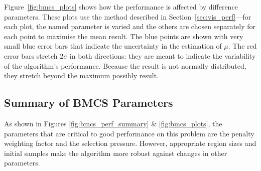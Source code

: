 \documentclass[10pt]{article}
\begin{document}
Figure~\ref{fig:bmcs_plots} shows how the performance is affected by
difference parameters. These plots use the method described in
Section~\ref{sec:vis_perf}---for each plot, the named parameter is varied and
the others are chosen separately for each point to maximise the mean result.
The blue points are shown with very small blue error bars that indicate the
uncertainty in the estimation of $\mu$. The red error bars stretch $2 \sigma$
in both directions: they are meant to indicate the variability of the
algorithm's performance. Because the result is not normally distributed,
they stretch beyond the maximum possibly result.

\subsection{Summary of BMCS Parameters}
\label{sec:bmcs_summary}

As shown in Figures \ref{fig:bmcs_perf_summary} \& \ref{fig:bmcs_plots}, the
parameters that are critical to good performance on this problem are the
penalty weighting factor and the selection pressure. However, appropriate
region sizes and initial samples make the algorithm more robust against
changes in other parameters.
\end{document}
